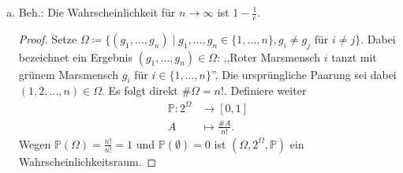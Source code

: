 \documentclass[uebung]{lecture}
\begin{document}
\begin{aufgabe}
\begin{enumerate}[(a)]
        \item Beh.: Die Wahrscheinlichkeit für $n \to \infty$ ist $1 - \frac{1}{e}$.
            \begin{proof}
                Setze $\Omega \coloneqq \{ (g_1, \ldots, g_n)  \mid g_1, \ldots, g_n \in \{1, \ldots, n\},
                g_i \neq g_j \text{ für } i \neq j\} $. Dabei bezeichnet ein Ergebnis
                $(g_1, \ldots, g_n) \in \Omega$: ,,Roter Marsmensch $i$ tanzt mit grünem Marsmensch $g_i$
                für $i \in \{1, \ldots, n\} $''. Die ursprüngliche Paarung
                sei dabei $(1, 2, \ldots, n) \in \Omega$.
                Es folgt direkt $\# \Omega = n!$.
                Definiere weiter
                \begin{align*}
                    \mathbb{P}\colon 2^{\Omega} &\to [0,1] \\
                    A &\mapsto \frac{\#A}{n!}
                .\end{align*}
                Wegen $\mathbb{P}(\Omega) = \frac{n!}{n!} = 1$ und $\mathbb{P}(\emptyset) = 0$
                ist $(\Omega, 2^{\Omega}, \mathbb{P})$ ein Wahrscheinlichkeitsraum.


\end{proof}
\end{enumerate}
\end{aufgabe}
\end{document}
